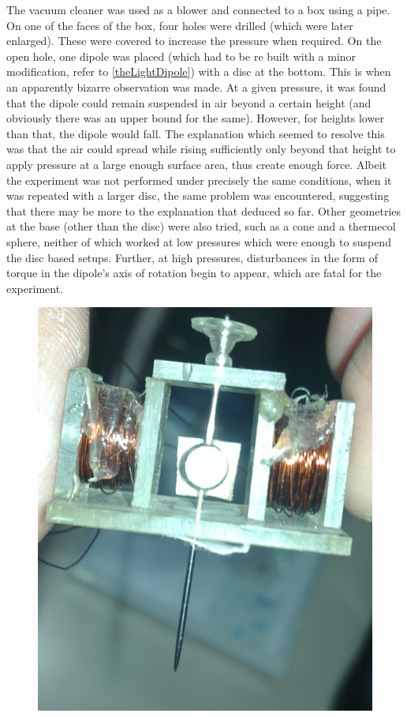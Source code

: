 \begin{enumerate}
					The vacuum cleaner was used as a blower and connected to a box using a pipe. On one of the faces of the box, four holes were drilled (which were later enlarged). These were covered to increase the pressure when required. On the open hole, one dipole was placed (which had to be re built with a minor modification, refer to \autoref{theLightDipole}) with a disc at the bottom. This is when an apparently bizarre observation was made. At a given pressure, it was found that the dipole could remain suspended in air beyond a certain height (and obviously there was an upper bound for the same). However, for heights lower than that, the dipole would fall. The explanation which seemed to resolve this was that the air could spread while rising sufficiently only beyond that height to apply pressure at a large enough surface area, thus create enough force. Albeit the experiment was not performed under precisely the same conditions, when it was repeated with a larger disc, the same problem was encountered, suggesting that there may be more to the explanation that deduced so far. Other geometries at the base (other than the disc) were also tried, such as a cone and a thermecol sphere, neither of which worked at low pressures which were enough to suspend the disc based setups. Further, at high pressures, disturbances in the form of torque in the dipole's axis of rotation begin to appear, which are fatal for the experiment.
					\begin{figure}[bth]
						\begin{center}
							\includegraphics[width=0.7\linewidth]{gfx/theLightDipole.jpg}

\end{center}
\end{figure}
\end{enumerate}

